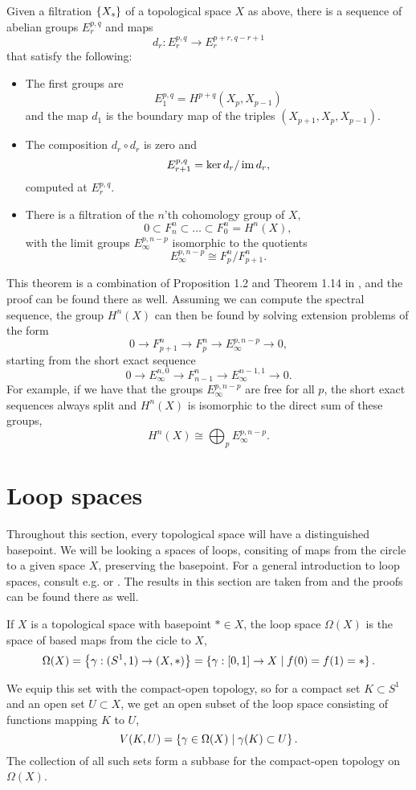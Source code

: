 \begin{theorem}
  \label{thm:ss}
  Given a filtration $\left\{ X_s \right\}$ of a topological space $X$ as above,
  there is a sequence of abelian groups $E_r^{p,q}$ and maps
  \[ d_r : E_r^{p,q} \to E_r^{p+r,q-r+1} \]
  that satisfy the following:
  \begin{itemize}
  \item The first groups are
    \[ E_1^{p,q} = H^{p+q}(X_p,X_{p-1}) \]
    and the map $d_1$ is the boundary map of the triples
    $(X_{p+1},X_p,X_{p-1})$.
  \item The composition $d_r \circ d_r$ is zero and
    \[ E_{r+1}^{p,q} = \ker d_r / \operatorname{im} d_r, \]
    computed at $E_r^{p,q}$.
  \item There is a filtration of the $n\!$'th cohomology group of $X$,
    \[ 0 \subset F_n^n \subset \dots \subset F_0^n = H^n(X), \]
    with the limit groups $E_\infty^{p,n-p}$ isomorphic to the
    quotients
    \[ E_\infty^{p,n-p} \cong F_p^n / F_{p+1}^n. \]
  \end{itemize}
\end{theorem}

This theorem is a combination of Proposition 1.2 and Theorem 1.14 in
\cite{hatcherss}, and the proof can be found there as well. Assuming
we can compute the spectral sequence, the group $H^n(X)$ can then be
found by solving extension problems of the form
\[ 0 \to F_{p+1}^n \to F_p^n \to E_\infty^{p,n-p} \to 0, \]
starting from the short exact sequence
\[ 0 \to E_\infty^{n,0} \to F_{n-1}^n \to E_\infty^{n-1,1} \to 0. \]
For example, if we have that the groups $E_{\infty}^{p,n-p}$ are free
for all $p$, the short exact sequences always split and $H^n(X)$ is
isomorphic to the direct sum of these groups,
\[ H^n(X) \cong \bigoplus_p E_\infty^{p,n-p}. \]

\section{Loop spaces}
\label{sec:ls}

Throughout this section, every topological space will have a
distinguished basepoint. We will be looking a spaces of loops,
consiting of maps from the circle to a given space $X$, preserving the
basepoint. For a general introduction to loop spaces, consult
e.g. \cite[Part~3]{milnor} or \cite[Section~8.2]{may}. The results in
this section are taken from \cite{milnor} and the proofs can be found
there as well.

\begin{definition}
  If $X$ is a topological space with basepoint $*\in
  X$, the loop space $\Omega(X)$ is the space of based maps from the
  cicle to $X$,
  \[ \Omega(X) = \left\{  \gamma : (S^1,1)\to (X,*)  \right\} = \left\{  \gamma : [0,1] \to X
    \mid f(0) = f(1) = *  \right\}. \]

  We equip this set with the compact-open topology, so for a compact
  set $K \subset S^1$ and an open set $U \subset X$, we get an open
  subset of the loop space consisting of functions mapping $K$ to $U$,
  \[ V(K,U) = \left\{  \gamma\in \Omega(X) \mid \gamma(K) \subset U  \right\}. \]
  The collection of all such sets form a subbase for the compact-open
  topology on $\Omega(X)$.
\end{definition}


